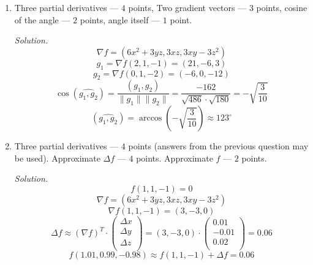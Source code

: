 \begin{enumerate}
\item Three partial derivatives --- $4$ points, Two gradient vectors --- $3$ points, cosine of the angle --- $2$ points, angle itself --- $1$ point.

\textit{Solution.}
\begin{equation*}\nabla f = (6 x^2+3 y z,3 x z,3 x y-3 z^2)\end{equation*}
\begin{equation*}g_1 = \nabla f(2,1,-1) = (21,-6,3)\end{equation*}
\begin{equation*}g_2 = \nabla f(0,1,-2) = (-6,0,-12)\end{equation*}
\begin{equation*}
\cos (\widehat{g_1,g_2}) = \frac {(g_1,g_2)}{\|g_1\|\|g_2\|} = \frac{-162}{\sqrt{486} \cdot \sqrt{180}}=-\sqrt{\frac{3}{10}}
\end{equation*}
\begin{equation*}
 (\widehat{g_1,g_2})  = \arccos(-\sqrt{\frac{3}{10}}) \approx 123 ^\circ
\end{equation*}

\item Three partial derivatives --- $4$ points (answers from the previous question may be used). Approximate $\Delta f$ --- $4$ points. Approximate $f$ --- $2$ points.

\textit{Solution.}
\begin{equation*}
f(1,1,-1) = 0
\end{equation*}
\begin{equation*}\nabla f = (6 x^2+3 y z,3 x z,3 x y-3 z^2)\end{equation*}
\begin{equation*}
\nabla f(1,1,-1) = (3,-3,0)
\end{equation*}
\begin{equation*}
\Delta f \approx (\nabla f)^T \cdot \left( \begin{array}{c}
\Delta x\\
\Delta y\\
\Delta z\\
\end{array}
\right)
 =\left(3,-3,0 \right)   \cdot \left( \begin{array}{c}
0.01\\
-0.01\\
0.02\\
\end{array}
\right) = 0.06
\end{equation*}
\begin{equation*}
f(1.01, 0.99, -0.98) \approx f(1,1,-1) +\Delta f =0.06
\end{equation*}



\end{enumerate}
